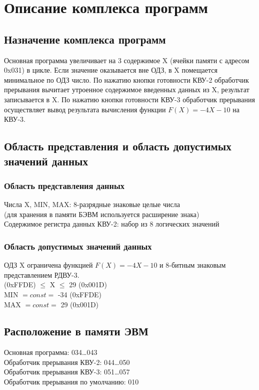 \section{Описание комплекса программ}
\subsection{Назначение комплекса программ}
Основная программа увеличивает на 3 содержимое X (ячейки памяти с адресом 0x031) в цикле. Если значение оказывается вне ОДЗ, в X помещается минимальное по ОДЗ число. По нажатию кнопки готовности КВУ-2 обработчик прерывания вычитает утроенное содержимое введенных данных из X, результат записывается в X. По нажатию кнопки готовности КВУ-3 обработчик прерывания осуществляет вывод результата вычисления функции $F(X)=-4X-10$ на КВУ-3.

\subsection{Область представления и область допустимых значений данных}
\subsubsection{Область представления данных}
\noindent Числа X, MIN, MAX: 8-разрядные знаковые целые числа\\
(для хранения в памяти БЭВМ используется расширение знака)\\
Содержимое регистра данных КВУ-2: набор из 8 логических значений

\subsubsection{Область допустимых значений данных}
\noindent ОДЗ X ограничена функцией $F(X)=-4X-10$ и 8-битным знаковым представлением РДВУ-3.\\

 (0xFFDE) $\leqslant$ X $\leqslant$ 29 (0x001D)\\
MIN $=const=$ -34 (0xFFDE)\\
MAX $=const=$ 29 (0x001D)

\subsection{Расположение в памяти ЭВМ}
\noindent Основная программа: 034\ldots043\\
Обработчик прерывания КВУ-2: 044\ldots050\\
Обработчик прерывания КВУ-3: 051\ldots057\\
Обработчик прерывания по умолчанию: 010\\

